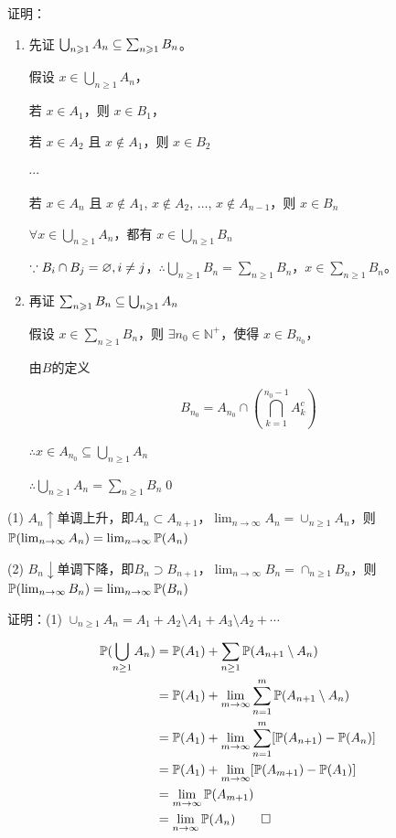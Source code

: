 证明：
\begin{enumerate}
    \item 先证 \(\bigcup_{n \geqslant 1} A_n \subseteq \sum_{n \geqslant 1} B_n\)。

    假设 \(x \in \bigcup_{n \geqslant 1} A_n\)，

    若 \(x \in A_1\)，则 \(x \in B_1\)，

    若 \(x \in A_2\) 且 \(x \notin A_1\)，则 \(x \in B_2\)

    $\cdots$

    若 \(x \in A_n\) 且 \(x \notin A_1\), \(x \notin A_2\), \(\ldots\), \(x \notin A_{n-1}\)，则 \(x \in B_n\)

    $\forall x\in \bigcup_{n\geq 1}A_n$，都有 $x\in \bigcup_{n\geq 1}B_n$

    \(\because B_i \cap B_j = \varnothing,i\neq j\)，\(\therefore \bigcup_{n \geqslant 1} B_n = \sum_{n \geqslant 1} B_n\)，\(x \in \sum_{n \geqslant 1} B_n\)。

    \item 再证 \(\sum_{n \geqslant 1} B_n \subseteq \bigcup_{n \geqslant 1} A_n\)

    假设 \(x \in \sum_{n \geqslant 1} B_n\)，则 \(\exists n_0 \in \mathbb{N}^+\)，使得 \(x \in B_{n_0}\)，

    由$B$的定义

    \[
    B_{n_0} = A_{n_0} \cap \left( \bigcap_{k=1}^{n_0-1} A_k^c \right)
    \]

    \(\therefore x \in A_{n_0} \subseteq \bigcup_{n \geqslant 1} A_n\)

    \(\therefore \bigcup_{n \geqslant 1} A_n = \sum_{n \geqslant 1} B_n\)\qed
\end{enumerate}

\begin{property}[连续性]
    (1) $A_n\uparrow$单调上升，即$A_n\subset A_{n+1}$，$\lim_{n\rightarrow \infty}A_n=\cup_{n\geq 1}A_n$，则 $\mathbb{P}(\lim_{n\rightarrow \infty}A_n)=\lim_{n\rightarrow \infty}\mathbb{P}(A_n)$

    (2) $B_n\downarrow$单调下降，即$B_n\supset B_{n+1}$，$\lim_{n\rightarrow \infty}B_n=\cap_{n\geq 1}B_n$，则 $\mathbb{P}(\lim_{n\rightarrow \infty}B_n)=\lim_{n\rightarrow \infty}\mathbb{P}(B_n)$
\end{property}

证明：(1) $\cup_{n\geq 1}A_n=A_1+A_2\setminus A_1+A_3\setminus A_2+\cdots$

\[
\begin{aligned}
    \mathbb{P}(\bigcup_{n\geq 1}A_n)&=\mathbb{P}(A_1)+\sum_{n\geq 1}\mathbb{P}(A_{n+1}\setminus A_n)\\
    &=\mathbb{P}(A_1)+\lim_{m \to \infty}\sum_{n=1}^m \mathbb{P}(A_{n+1}\setminus A_n)\\
    &=\mathbb{P}(A_1)+\lim_{m \to \infty}\sum_{n=1}^m [\mathbb{P}(A_{n+1})-\mathbb{P}(A_n)]\\
    &=\mathbb{P}(A_1)+\lim_{m \to \infty}[\mathbb{P}(A_{m+1})-\mathbb{P}(A_1)]\\
    &=\lim_{m \to \infty} \mathbb{P}(A_{m+1})\\
    &=\lim_{n \to \infty} \mathbb{P}(A_n)\qed
\end{aligned}
\]

